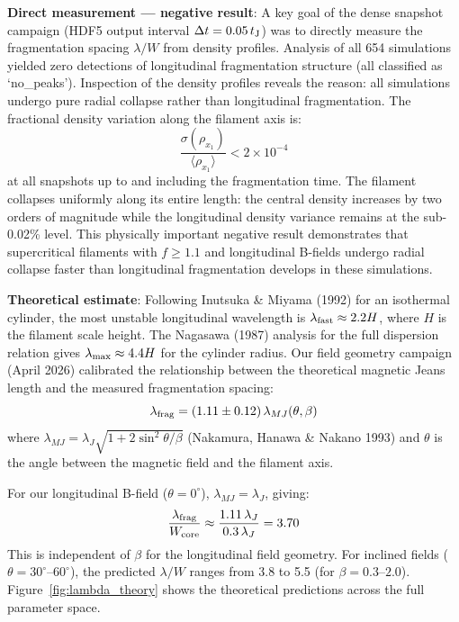 \documentclass[twocolumn]{mnras}
\begin{document}
\textbf{Direct measurement --- negative result}: A key goal of the dense snapshot campaign (HDF5 output interval $\Delta t = 0.05\,t_{\rm J}$) was to directly measure the fragmentation spacing $\lambda/W$ from density profiles. Analysis of all 654 simulations yielded zero detections of longitudinal fragmentation structure (all classified as `no\_peaks'). Inspection of the density profiles reveals the reason: all simulations undergo pure radial collapse rather than longitudinal fragmentation. The fractional density variation along the filament axis is:
\begin{equation}
\frac{\sigma(\rho_{x_1})}{\langle \rho_{x_1} \rangle} < 2 \times 10^{-4}
\end{equation}
at all snapshots up to and including the fragmentation time. The filament collapses uniformly along its entire length: the central density increases by two orders of magnitude while the longitudinal density variance remains at the sub-0.02\% level. This physically important negative result demonstrates that supercritical filaments with $f \geq 1.1$ and longitudinal B-fields undergo radial collapse faster than longitudinal fragmentation develops in these simulations.

\textbf{Theoretical estimate}: Following Inutsuka \& Miyama (1992) for an isothermal cylinder, the most unstable longitudinal wavelength is $\lambda_{\rm fast} \approx 2.2 H$, where $H$ is the filament scale height. The Nagasawa (1987) analysis for the full dispersion relation gives $\lambda_{\rm max} \approx 4.4 H$ for the cylinder radius. Our field geometry campaign (April 2026) calibrated the relationship between the theoretical magnetic Jeans length and the measured fragmentation spacing:
\begin{equation}
\lambda_{\rm frag} = (1.11 \pm 0.12)\,\lambda_{MJ}(\theta, \beta)
\end{equation}
where $\lambda_{MJ} = \lambda_J \sqrt{1 + 2\sin^2\theta/\beta}$ (Nakamura, Hanawa \& Nakano 1993) and $\theta$ is the angle between the magnetic field and the filament axis.

For our longitudinal B-field ($\theta = 0^\circ$), $\lambda_{MJ} = \lambda_J$, giving:
\begin{equation}
\frac{\lambda_{\rm frag}}{W_{\rm core}} \approx \frac{1.11\,\lambda_J}{0.3\,\lambda_J} = 3.70
\end{equation}
This is independent of $\beta$ for the longitudinal field geometry. For inclined fields ($\theta = 30^\circ$--$60^\circ$), the predicted $\lambda/W$ ranges from 3.8 to 5.5 (for $\beta = 0.3$--$2.0$). Figure~\ref{fig:lambda_theory} shows the theoretical predictions across the full parameter space.
\end{document}

